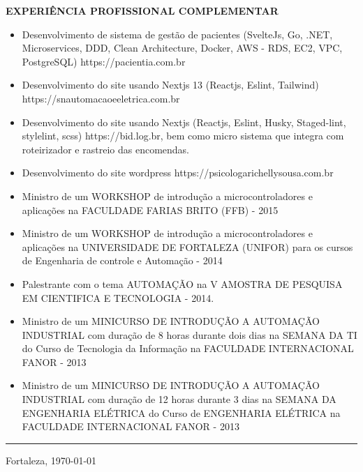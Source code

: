\documentclass[12pt, a4paper]{article}
\newcommand{\LlinhaG}{2pt} %
\newcommand{\TlinhaG}{17cm}  %
\begin{document}
\begin{center}
	\textbf{EXPERIÊNCIA PROFISSIONAL COMPLEMENTAR}\\
\end{center}
\begin{itemize}
	\item Desenvolvimento de sistema de gestão de pacientes (SvelteJs, Go, .NET, Microservices, DDD, Clean Architecture, Docker, AWS - RDS, EC2, VPC, PostgreSQL) https://pacientia.com.br
	\item Desenvolvimento do site usando Nextjs 13 (Reactjs, Eslint, Tailwind) https://snautomacaoeeletrica.com.br
	\item Desenvolvimento do site usando Nextjs (Reactjs, Eslint, Husky, Staged-lint, stylelint, scss) https://bid.log.br, bem como micro sistema que integra com roteirizador e rastreio das encomendas.
	\item Desenvolvimento do site wordpress https://psicologarichellysousa.com.br
	\item Ministro de um WORKSHOP  de introdução a microcontroladores e aplicações na FACULDADE FARIAS BRITO (FFB) - 2015
	\item Ministro de um WORKSHOP  de introdução a microcontroladores e aplicações na UNIVERSIDADE DE FORTALEZA (UNIFOR) para os cursos de Engenharia de controle e Automação - 2014
	\item Palestrante com o tema AUTOMAÇÃO  na V AMOSTRA DE PESQUISA EM CIENTIFICA E TECNOLOGIA - 2014.
	\item Ministro de um MINICURSO DE INTRODUÇÃO A AUTOMAÇÃO INDUSTRIAL com duração de 8 horas durante dois dias na SEMANA DA TI do Curso de Tecnologia da Informação na FACULDADE INTERNACIONAL FANOR - 2013
	\item Ministro de um MINICURSO DE INTRODUÇÃO A AUTOMAÇÃO INDUSTRIAL com duração de 12 horas durante 3 dias na SEMANA DA ENGENHARIA ELÉTRICA do Curso de ENGENHARIA ELÉTRICA na FACULDADE INTERNACIONAL FANOR - 2013
\end{itemize}

\begin{center}
	\rule{\TlinhaG}{\LlinhaG}
\end{center}

\vspace{5cm}
\begin{center}
	\noindent Fortaleza, \today  %
\end{center}
\end{document}
